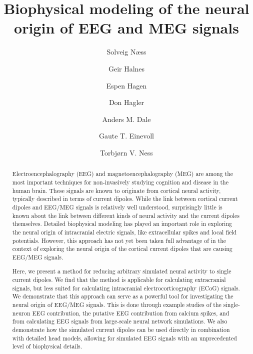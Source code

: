 \documentclass[preprint,10pt,authoryear]{elsarticle}
\begin{document}
	
\begin{frontmatter}
	
	\title{Biophysical modeling of the neural origin of EEG and MEG signals
	}
	
	\author{Solveig N\ae{}ss}
	\author{Geir Halnes}
	\author{Espen Hagen }
	\author{Don Hagler}
	\author{Anders M. Dale}
	\author{Gaute T. Einevoll}
	\author{Torbj\o{}rn V. Ness}
	
	\address[label1]{Department of Informatics, University of Oslo, Oslo, Norway}
	\address[label2]{Faculty of Science and Technology, Norwegian University of Life Sciences, Ås, Norway}
	\address[label3]{Department of Radiology, University of California, San Diego, CA, USA}
	\address[label4]{Departments of Neurosciences and Radiology, University of California, San Diego, CA, USA}
	\address[label5]{Department of Physics, University of Oslo, Oslo, Norway}
	
	
	\begin{abstract}
	Electroencephalography (EEG) and magnetoencephalography (MEG) are among the most important techniques for non-invasively studying cognition and disease in the human brain. 
These signals are known to originate from cortical neural activity, typically described in terms of current dipoles.
While the link between cortical current dipoles and EEG/MEG signals is relatively well understood, surprisingly little is known about the link between different kinds of neural activity and the current dipoles themselves.
Detailed biophysical modeling has played an important role in exploring the neural origin of intracranial electric signals, like extracellular spikes and local field potentials. However, this approach has not yet been taken full advantage of in the context of exploring the neural origin of the cortical current dipoles that are causing EEG/MEG signals.

Here, we present a method for reducing arbitrary simulated neural activity to single current dipoles.
We find that the method is applicable for calculating extracranial signals, but less suited for calculating intracranial electrocorticography (ECoG) signals. We demonstrate that this approach can serve as a powerful tool for investigating the neural origin of EEG/MEG signals. This is done through example studies of the single-neuron EEG contribution, the putative EEG contribution from calcium spikes, and from calculating EEG signals from large-scale neural network simulations.
We also demonstrate how the simulated current dipoles can be used directly in combination with detailed head models, allowing for simulated EEG signals with an unprecedented level of biophysical details. 


\end{abstract}
\end{frontmatter}
\end{document}
